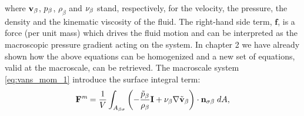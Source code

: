 where $\textbf{v}_{\beta}$, $p_{\beta}$, $\rho_{\beta}$ and $\nu_{\beta}$ stand, respectively, for  the velocity, the pressure, the density and the kinematic viscosity of the fluid.
The right-hand side term, $\mathbf{f}$, is a force (per unit mass) which drives the fluid motion and can be interpreted as the macroscopic pressure gradient acting on the system.
%
%
%
%
%
%
In chapter 2 we have already shown how the above equations can be homogenized and a new set of equations, valid at the macroscale, can be retrieved.
The macroscale system \eqref{eq:vans_mom_1} introduce the surface integral term:
$$\mathbf{F}^{\textit{m}} = \dfrac{1}{V} \displaystyle \int_{A_{\beta \sigma}} \left(-\dfrac{\tilde{p}_{\beta}}{\rho_{\beta}} \mathbf{I}  + \nu_{\beta} \nabla \tilde{\textbf{v}}_{\beta} \right)\cdot \mathbf{n}_{\sigma \beta} \;dA, $$


